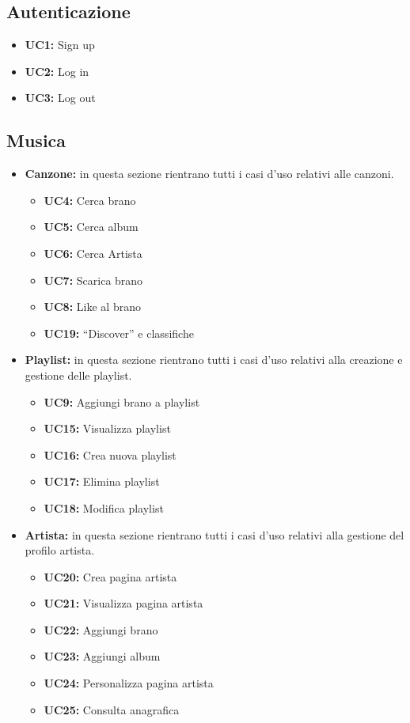 \subsection{\textbf{Autenticazione}}
    \begin{itemize}
        \item \textbf{UC1:} Sign up 
        \item \textbf{UC2:} Log in
        \item \textbf{UC3:} Log out 
    \end{itemize}



\subsection{\textbf{Musica}}
\begin{itemize}
    \item \textbf{Canzone:} in questa sezione rientrano tutti i casi d'uso relativi alle canzoni.
    \begin{itemize}
        \item \textbf{UC4:} Cerca brano
        \item \textbf{UC5:} Cerca album
        \item \textbf{UC6:} Cerca Artista
        \item \textbf{UC7:} Scarica brano
        \item \textbf{UC8:} Like al brano
        \item \textbf{UC19:} ``Discover'' e classifiche
    \end{itemize} 
    
    \item \textbf{Playlist:} in questa sezione rientrano tutti i casi d'uso relativi alla creazione e gestione delle playlist.
    \begin{itemize}
        \item \textbf{UC9:} Aggiungi brano a playlist
        \item \textbf{UC15:} Visualizza playlist 
        \item \textbf{UC16:} Crea nuova playlist 
        \item \textbf{UC17:} Elimina playlist
        \item \textbf{UC18:} Modifica playlist
    \end{itemize}
    
    \item \textbf{Artista:} in questa sezione rientrano tutti i casi d'uso relativi alla gestione del profilo artista.
    \begin{itemize}
        \item  \textbf{UC20:} Crea pagina artista 
        \item  \textbf{UC21:} Visualizza pagina artista 
        \item  \textbf{UC22:} Aggiungi brano 
        \item  \textbf{UC23:} Aggiungi album 
        \item  \textbf{UC24:} Personalizza pagina artista 
        \item  \textbf{UC25:} Consulta anagrafica
    \end{itemize} 
\end{itemize}

